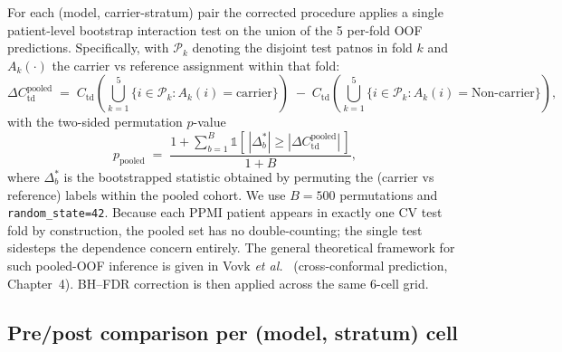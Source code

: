 \documentclass[11pt]{article}
\begin{document}
For each (model, carrier-stratum) pair the corrected procedure applies a single patient-level bootstrap interaction test on the union of the 5 per-fold OOF predictions. Specifically, with $\mathcal{P}_k$ denoting the disjoint test patnos in fold $k$ and $A_k(\cdot)$ the carrier vs reference assignment within that fold:
\begin{equation}
\Delta C_\mathrm{td}^{\text{pooled}} \;=\; C_\mathrm{td}\!\left(\bigcup_{k=1}^{5}\{i \in \mathcal{P}_k : A_k(i)=\text{carrier}\}\right) \;-\; C_\mathrm{td}\!\left(\bigcup_{k=1}^{5}\{i \in \mathcal{P}_k : A_k(i)=\text{Non-carrier}\}\right),
\label{eq:scritb_delta}
\end{equation}
with the two-sided permutation $p$-value
\begin{equation}
p_\mathrm{pooled} \;=\; \frac{1 + \sum_{b=1}^{B}\mathbb{1}\!\left[\,|\Delta_b^{*}| \ge |\Delta C_\mathrm{td}^{\text{pooled}}|\,\right]}{1 + B},
\label{eq:scritb_p}
\end{equation}
where $\Delta_b^{*}$ is the bootstrapped statistic obtained by permuting the (carrier vs reference) labels within the pooled cohort. We use $B{=}500$ permutations and \texttt{random\_state=42}. Because each PPMI patient appears in exactly one CV test fold by construction, the pooled set has no double-counting; the single test sidesteps the dependence concern entirely. The general theoretical framework for such pooled-OOF inference is given in Vovk \emph{et al.}~\cite{vovk2022conformal} (cross-conformal prediction, Chapter~4). BH--FDR correction is then applied across the same 6-cell grid.

\subsection*{Pre/post comparison per (model, stratum) cell}
\end{document}
